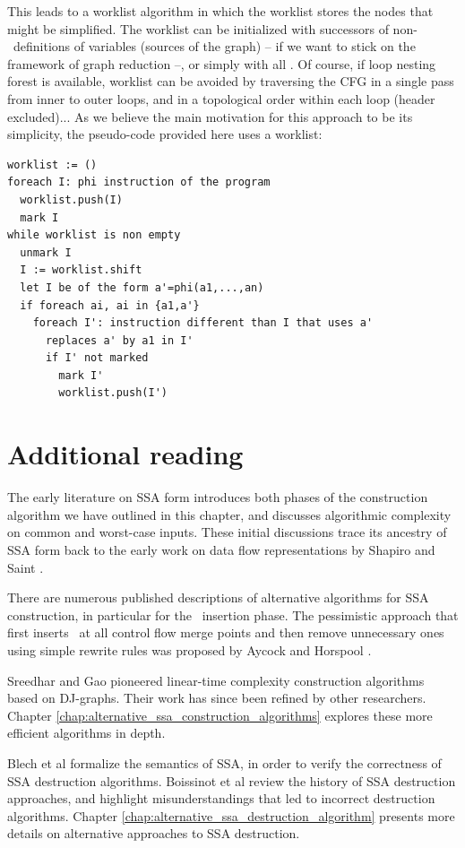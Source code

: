 This leads to a worklist algorithm in which the worklist stores the nodes that might be simplified. The worklist can be initialized with successors of non-\phiops\ definitions of variables (sources of the graph) -- if we want to stick on the framework of graph reduction --, or simply with all \phiops. Of course, if loop nesting forest is available, worklist can be avoided by traversing the CFG in a single pass from inner to outer loops, and in a topological order within each loop (header excluded)... 
As we believe the main motivation for this approach to be its simplicity, the pseudo-code provided here uses a worklist:

\begin{verbatim}
worklist := ()
foreach I: phi instruction of the program
  worklist.push(I)
  mark I
while worklist is non empty
  unmark I
  I := worklist.shift
  let I be of the form a'=phi(a1,...,an)
  if foreach ai, ai in {a1,a'}
    foreach I': instruction different than I that uses a'
      replaces a' by a1 in I'
      if I' not marked
        mark I'
        worklist.push(I')
\end{verbatim}


\section{Additional reading}

The early literature on SSA form
\cite{cytron89efficient,cytron91efficiently}
introduces both phases of the construction algorithm
we have outlined in this chapter,
and discusses algorithmic complexity on common and worst-case inputs.
These initial discussions trace its ancestry of SSA form back to the
early work on data flow representations by Shapiro and Saint
\cite{shapiro69representation}.

There are numerous published descriptions of alternative algorithms
for SSA construction, in particular for the \phiop\ insertion phase.
The pessimistic approach that first inserts \phiops\ at all control flow merge points and then remove unnecessary ones using simple rewrite rules was proposed by Aycock
and Horspool \cite{aycock00simple}. 

Sreedhar and Gao \cite{sreedhar95linear} pioneered
linear-time complexity construction algorithms based on DJ-graphs.
Their work has since been refined by other researchers.
Chapter \ref{chap:alternative_ssa_construction_algorithms}
explores these more efficient algorithms in depth.

Blech et al \cite{blech05optimizing}
formalize the semantics of SSA, in order to verify
the correctness of SSA destruction algorithms.
Boissinot et al \cite{boissinot09revisiting} review the history of SSA destruction approaches,
and highlight misunderstandings that led to incorrect destruction
algorithms.
Chapter \ref{chap:alternative_ssa_destruction_algorithm} presents
more details on alternative approaches to SSA destruction.

